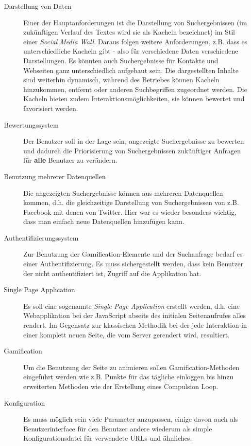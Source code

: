 \documentclass[12pt,twoside]{book}
\begin{document}
\begin{description}

\item[Darstellung von Daten]

Einer der Hauptanforderungen ist die Darstellung von Suchergebnissen (im zukünftigen Verlauf des Textes wird sie als Kacheln bezeichnet) im Stil einer \textit{Social Media Wall}. Daraus folgen weitere Anforderungen, z.B. dass es unterschiedliche Kacheln gibt - also für verschiedene Daten verschiedene Darstellungen. Es könnten auch Suchergebnisse für Kontakte und Webseiten ganz unterschiedlich aufgebaut sein. Die dargestellten Inhalte sind weiterhin dynamisch, während des Betriebes können Kacheln hinzukommen, entfernt oder anderen Suchbegriffen zugeordnet werden. Die Kacheln bieten zudem Interaktionsmöglichkeiten, sie können bewertet und favorisiert werden.

\item[Bewertungssystem]

  Der Benutzer soll in der Lage sein, angezeigte Suchergebnisse zu bewerten und dadurch die Priorisierung von Suchergebnissen zukünftiger Anfragen für \textbf{alle} Benutzer zu verändern.

\item[Benutzung mehrerer Datenquellen]
  Die angezeigten Suchergebnisse können aus mehreren Datenquellen kommen, d.h. die gleichzeitige Darstellung von Suchergebnissen von z.B. Facebook mit denen von Twitter. Hier war es wieder besonders wichtig, dass man einfach neue Datenquellen hinzufügen kann.

\item[Authentifizierungssystem]
	Zur Benutzung der Gamification-Elemente und der Suchanfrage bedarf es einer Authentifizierung. Es muss sichergestellt werden, dass kein Benutzer der nicht authentifiziert ist, Zugriff auf die Applikation hat.

\item[Single Page Application]
  Es soll eine sogenannte \textit{Single Page Application} erstellt werden, d.h. eine Webapplikation bei der JavaScript abseits des initialen Seitenaufrufes alles rendert. Im Gegensatz zur klassischen Methodik bei der jede Interaktion in einer komplett neuen Seite, die vom Server gerendert wird, resultiert.

\item[Gamification]
  Um die Benutzung der Seite zu animieren sollen Gamification-Methoden eingeführt werden wie z.B. Punkte für das tägliche einloggen bis hinzu erweiterten Methoden wie der Erstellung eines Compulsion Loop.

\item[Konfiguration]
  Es muss möglich sein viele Parameter anzupassen, einige davon auch als Benutzerinterface für den Benutzer andere wiederum als simple Konfigurationsdatei für verwendete URLs und ähnliches.

\end{description}
\end{document}
